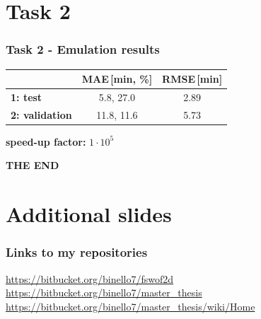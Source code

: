 \documentclass[xcolor=dvipsnames, USenglish]{beamer}  %
\begin{document}
\section{Task 2}
  \begin{frame}
    \frametitle{Task 2 - Emulation results}
    \begin{table}
    \centering
       \begin{tabular}{lcc}
       \toprule
        & \textbf{MAE\,[min, \%]} & \textbf{RMSE\,[min]}\\
       \midrule
       \textbf{1: test} & 5.8, 27.0 & 2.89\\
       \textbf{2: validation} & 11.8, 11.6 & 5.73\\
       \bottomrule
       \end{tabular}
    \end{table}
    \centering
    \large{\textbf{speed-up factor:} \boldmath$1 \cdot 10^5$}
  \end{frame}

  {
  \begin{frame}[plain]
    \centering
    \Large{\textbf{THE END}}\\
  \end{frame}
  }

\section{Additional slides}
  \begin{frame}
    \frametitle{Links to my repositories}
    \small{\url{https://bitbucket.org/binello7/fswof2d}}\\
    \small{\url{https://bitbucket.org/binello7/master_thesis}}\\
    \small{\url{https://bitbucket.org/binello7/master_thesis/wiki/Home}}
  \end{frame}
\end{document}
